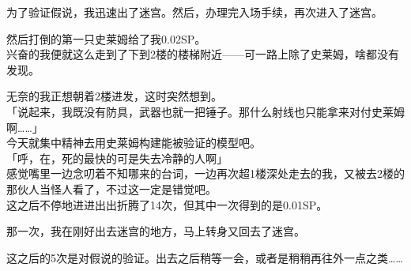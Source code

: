为了验证假说，我迅速出了迷宫。然后，办理完入场手续，再次进入了迷宫。

然后打倒的第一只史莱姆给了我0.02SP。\\

兴奋的我便就这么走到了下到2楼的楼梯附近——可一路上除了史莱姆，啥都没有发现。

无奈的我正想朝着2楼进发，这时突然想到。\\

「说起来，我既没有防具，武器也就一把锤子。那什么射线也只能拿来对付史莱姆啊……」\\

今天就集中精神去用史莱姆构建能被验证的模型吧。\\

「呼，在，死的最快的可是失去冷静的人啊」\\

感觉嘴里一边念叨着不知哪来的台词，一边再次超1楼深处走去的我，又被去2楼的那伙人当怪人看了，不过这一定是错觉吧。\\

这之后不停地进进出出折腾了14次，但其中一次得到的是0.01SP。

那一次，我在刚好出去迷宫的地方，马上转身又回去了迷宫。

这之后的5次是对假说的验证。出去之后稍等一会，或者是稍稍再往外一点之类……\\

